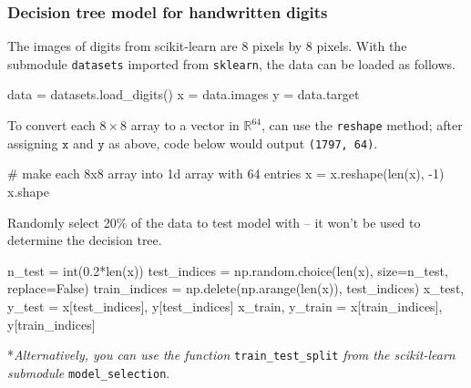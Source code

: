 \documentclass[smaller]{beamer}
\newenvironment{codeblock}
    {\hfill\begin{beamerboxesrounded}[lower=codecol, width=0.8\textwidth]
    \medskip

    }
    { 
    \end{beamerboxesrounded}\hfill
    }
\theoremstyle{example}
\newcommand{\ttt}[1]{{\small\texttt{#1}}}
\begin{document}
\begin{frame}[fragile]
    \frametitle{Decision tree model for handwritten digits}
The images of digits from scikit-learn are $8$ pixels by $8$ pixels. With the submodule \ttt{datasets} imported from \ttt{sklearn}, the data can be loaded as follows.

\begin{codeblock}

\begin{python}
data = datasets.load_digits()
x = data.images
y = data.target
\end{python}

\end{codeblock}

To convert each $8\times 8$ array to a vector in $\mathbb R^{64}$, can use the \ttt{reshape} method; after assigning $\texttt{x}$ and $\texttt{y}$ as above, code below would output \ttt{(1797, 64)}.

\begin{codeblock}

\begin{python}
# make each 8x8 array into 1d array with 64 entries
x = x.reshape(len(x), -1)
x.shape
\end{python}
    
\end{codeblock}

Randomly select 20\% of the data to test model with {--} it won't be used to determine the decision tree.

\begin{codeblock}

\begin{python}
n_test = int(0.2*len(x))
test_indices = np.random.choice(len(x), size=n_test, replace=False)
train_indices = np.delete(np.arange(len(x)), test_indices)
x_test, y_test = x[test_indices], y[test_indices]
x_train, y_train = x[train_indices], y[train_indices]
\end{python}
    
\end{codeblock}
    
*\textit{Alternatively, you can use the function} \lstinline[language=Python,basicstyle=\ttfamily]{train_test_split} \textit{from the scikit-learn submodule} \lstinline[language=Python,basicstyle=\ttfamily]{model_selection}.
\end{frame}
\end{document}
